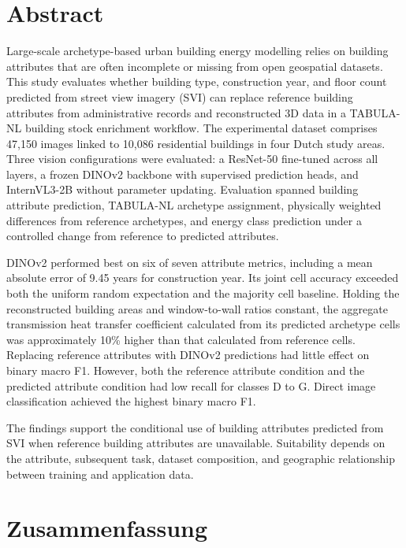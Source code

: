 \section*{Abstract}

Large-scale archetype-based urban building energy modelling relies on building attributes that are often incomplete or missing from open geospatial datasets. This study evaluates whether building type, construction year, and floor count predicted from street view imagery (SVI) can replace reference building attributes from administrative records and reconstructed 3D data in a TABULA-NL building stock enrichment workflow. The experimental dataset comprises 47,150 images linked to 10,086 residential buildings in four Dutch study areas. Three vision configurations were evaluated: a ResNet-50 fine-tuned across all layers, a frozen DINOv2 backbone with supervised prediction heads, and InternVL3-2B without parameter updating. Evaluation spanned building attribute prediction, TABULA-NL archetype assignment, physically weighted differences from reference archetypes, and energy class prediction under a controlled change from reference to predicted attributes.

DINOv2 performed best on six of seven attribute metrics, including a mean absolute error of 9.45 years for construction year. Its joint cell accuracy exceeded both the uniform random expectation and the majority cell baseline. Holding the reconstructed building areas and window-to-wall ratios constant, the aggregate transmission heat transfer coefficient calculated from its predicted archetype cells was approximately 10\% higher than that calculated from reference cells. Replacing reference attributes with DINOv2 predictions had little effect on binary macro F1. However, both the reference attribute condition and the predicted attribute condition had low recall for classes D to G. Direct image classification achieved the highest binary macro F1.

The findings support the conditional use of building attributes predicted from SVI when reference building attributes are unavailable. Suitability depends on the attribute, subsequent task, dataset composition, and geographic relationship between training and application data.

\newpage
\section*{Zusammenfassung}

